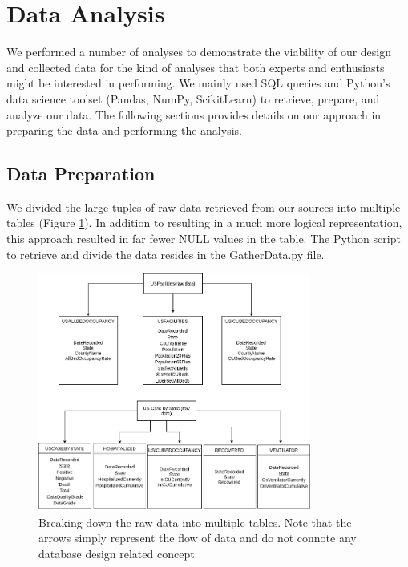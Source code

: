 \documentclass[11pt]{article}
\begin{document}
\pagebreak

\section{Data Analysis}
\label{sec:analysis}

\noindent
We performed a number of analyses to demonstrate the viability of our design and collected data for the kind of analyses that both experts and enthusiasts might be interested in performing. We mainly used SQL queries and Python's data science toolset (Pandas\cite{citepandas}, NumPy\cite{citenumpy}, ScikitLearn\cite{cite_scikit-learn}) to retrieve, prepare, and analyze our data. The following sections provides details on our approach in preparing the data and performing the analysis.

\subsection{Data Preparation}

\noindent
We divided the large tuples of raw data retrieved from our sources into multiple tables (Figure \ref{fig:tbl_bd}). In addition to resulting in a much more logical representation, this approach resulted in far fewer NULL values in the table. The Python script to retrieve and divide the data resides in the GatherData.py file.

\FloatBarrier
\begin{figure}[h]
    \centering
    \includegraphics[width=0.8\textwidth]{diagrams/data_breakdown.png}
    \caption{Breaking down the raw data into multiple tables. Note that the arrows simply represent the flow of data and do not connote any database design related concept}
    \label{fig:tbl_bd}
\end{figure}
\FloatBarrier
\end{document}
